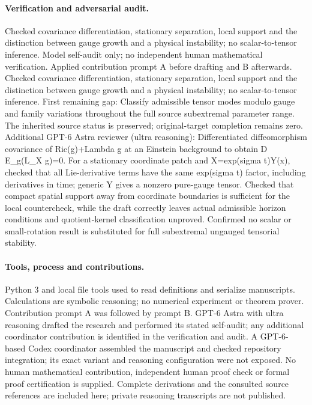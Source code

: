 \documentclass[11pt]{article}
\begin{document}
\paragraph{Verification and adversarial audit.}
Checked covariance differentiation, stationary separation, local support and the distinction between gauge growth and a physical instability; no scalar-to-tensor inference. Model self-audit only; no independent human mathematical verification. Applied contribution prompt A before drafting and B afterwards. Checked covariance differentiation, stationary separation, local support and the distinction between gauge growth and a physical instability; no scalar-to-tensor inference. First remaining gap: Classify admissible tensor modes modulo gauge and family variations throughout the full source subextremal parameter range. The inherited source status is preserved; original-target completion remains zero. Additional GPT-6 Astra reviewer (ultra reasoning): Differentiated diffeomorphism covariance of Ric(g)+Lambda g at an Einstein background to obtain D E\_g(L\_X g)=0. For a stationary coordinate patch and X=exp(sigma t)Y(x), checked that all Lie-derivative terms have the same exp(sigma t) factor, including derivatives in time; generic Y gives a nonzero pure-gauge tensor. Checked that compact spatial support away from coordinate boundaries is sufficient for the local countercheck, while the draft correctly leaves actual admissible horizon conditions and quotient-kernel classification unproved. Confirmed no scalar or small-rotation result is substituted for full subextremal ungauged tensorial stability.

\paragraph{Tools, process and contributions.}
Python 3 and local file tools used to read definitions and serialize manuscripts. Calculations are symbolic reasoning; no numerical experiment or theorem prover. Contribution prompt A was followed by prompt B. GPT-6 Astra with ultra reasoning drafted the research and performed its stated self-audit; any additional coordinator contribution is identified in the verification and audit. A GPT-6-based Codex coordinator assembled the manuscript and checked repository integration; its exact variant and reasoning configuration were not exposed. No human mathematical contribution, independent human proof check or formal proof certification is supplied. Complete derivations and the consulted source references are included here; private reasoning transcripts are not published.
\end{document}
